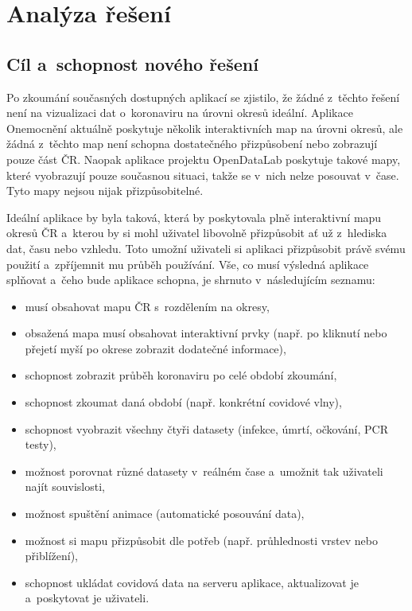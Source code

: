 \chapter{Analýza řešení}

\section{Cíl a~schopnost nového řešení}

Po zkoumání současných dostupných aplikací se zjistilo, že žádné z~těchto řešení není na vizualizaci dat o~koronaviru na úrovni okresů ideální. Aplikace Onemocnění aktuálně poskytuje několik interaktivních map na úrovni okresů, ale žádná z~těchto map není schopna dostatečného přizpůsobení nebo zobrazují pouze část ČR. Naopak aplikace projektu OpenDataLab poskytuje takové mapy, které vyobrazují pouze současnou situaci, takže se v~nich nelze posouvat v~čase. Tyto mapy nejsou nijak přizpůsobitelné.

Ideální aplikace by byla taková, která by poskytovala plně interaktivní mapu okresů ČR a~kterou by si mohl uživatel libovolně přizpůsobit ať už z~hlediska dat, času nebo vzhledu. Toto umožní uživateli si aplikaci přizpůsobit právě svému použití a~zpříjemnit mu průběh používání. Vše, co musí výsledná aplikace splňovat a~čeho bude aplikace schopna, je shrnuto v~následujícím seznamu:

\begin{itemize}
    \item musí obsahovat mapu ČR s~rozdělením na okresy,
    \item obsažená mapa musí obsahovat interaktivní prvky (např. po kliknutí nebo přejetí myší po okrese zobrazit dodatečné informace),
    \item schopnost zobrazit průběh koronaviru po celé období zkoumání,
    \item schopnost zkoumat daná období (např. konkrétní covidové vlny),
    \item schopnost vyobrazit všechny čtyři datasety (infekce, úmrtí, očkování, PCR testy),
    \item možnost porovnat různé datasety v~reálném čase a~umožnit tak uživateli najít souvislosti,
    \item možnost spuštění animace (automatické posouvání data),
    \item možnost si mapu přizpůsobit dle potřeb (např. průhlednosti vrstev nebo přiblížení),
    \item schopnost ukládat covidová data na serveru aplikace, aktualizovat je a~poskytovat je uživateli.
\end{itemize}

